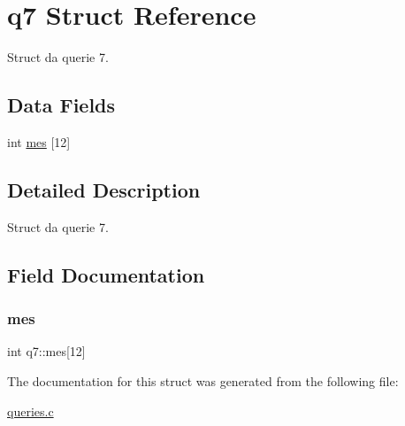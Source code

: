 \hypertarget{structq7}{}\section{q7 Struct Reference}
\label{structq7}


Struct da querie 7.  


\subsection*{Data Fields}
\begin{DoxyCompactItemize}
\item 
int \mbox{\hyperlink{structq7_a1d4df290ce2958fab06b17da36f9b9a0}{mes}} \mbox{[}12\mbox{]}
\end{DoxyCompactItemize}


\subsection{Detailed Description}
Struct da querie 7. 



\subsection{Field Documentation}
\mbox{\label{structq7_a1d4df290ce2958fab06b17da36f9b9a0}} 
\subsubsection{\texorpdfstring{mes}{mes}}
{\footnotesize\ttfamily int q7\+::mes\mbox{[}12\mbox{]}}



The documentation for this struct was generated from the following file\+:\begin{DoxyCompactItemize}
\item 
\mbox{\hyperlink{queries_8c}{queries.\+c}}\end{DoxyCompactItemize}
